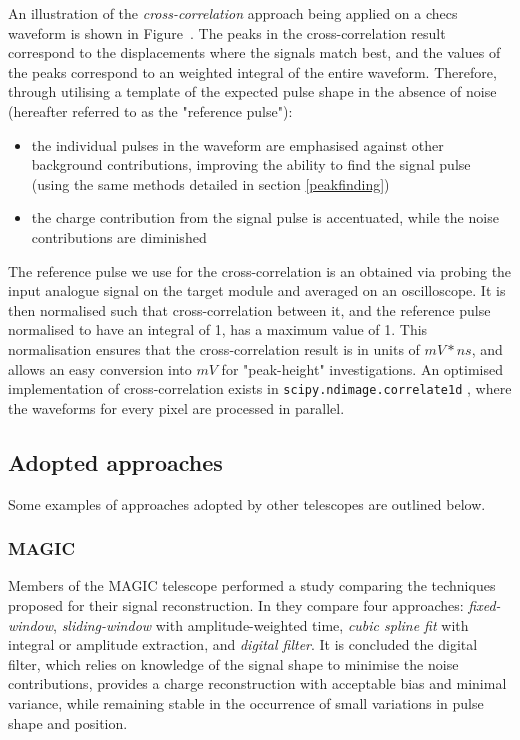 An illustration of the \textit{cross-correlation} approach being applied on a \gls{checs} waveform is shown in Figure~. The peaks in the cross-correlation result correspond to the displacements where the signals match best, and the values of the peaks correspond to an weighted integral of the entire waveform. Therefore, through utilising a template of the expected pulse shape in the absence of noise (hereafter referred to as the "reference pulse"):
\begin{itemize}
	\item the individual pulses in the waveform are emphasised against other background contributions, improving the ability to find the signal pulse (using the same methods detailed in section \ref{peakfinding})
	\item the charge contribution from the signal pulse is accentuated, while the noise contributions are diminished
\end{itemize}
The reference pulse we use for the cross-correlation is an obtained via probing the input analogue signal on the \gls{target} module and averaged on an oscilloscope. It is then normalised such that cross-correlation between it, and the reference pulse normalised to have an integral of 1, has a maximum value of 1. This normalisation ensures that the cross-correlation result is in units of $mV*ns$, and allows an easy conversion into $mV$ for "peak-height" investigations.  An optimised implementation of cross-correlation exists in \lstinline{scipy.ndimage.correlate1d} \cite{scipy-crosscorrelate}, where the waveforms for every pixel are processed in parallel.

\subsection{Adopted approaches}

Some examples of approaches adopted by other telescopes are outlined below.

\subsubsection{MAGIC}

Members of the MAGIC telescope performed a study comparing the techniques proposed for their signal reconstruction. In \cite{Albert2008} they compare four approaches: \textit{fixed-window}, \textit{sliding-window} with amplitude-weighted time, \textit{cubic spline fit} with integral or amplitude extraction, and \textit{digital filter}. It is concluded the digital filter, which relies on knowledge of the signal shape to minimise the noise contributions, provides a charge reconstruction with acceptable bias and minimal variance, while remaining stable in the occurrence of small variations in pulse shape and position.

